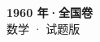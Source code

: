 \documentclass[zihao=-4, a4paper]{ctexart}
\begin{document}
\begin{center}
  {\Large\bfseries 1960 年·全国卷}\\[4pt]
  {\large 数学 · 试题版}
\end{center}
\medskip
{}

\end{document}
